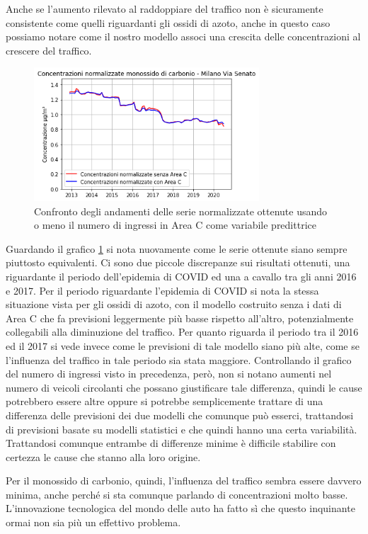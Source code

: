 \documentclass[a4paper]{report}
\begin{document}
Anche se l'aumento rilevato al raddoppiare del traffico non è sicuramente consistente come quelli riguardanti gli ossidi di azoto, anche in questo caso possiamo notare come il nostro modello associ una crescita delle concentrazioni al crescere del traffico. 

\begin{figure}[h]
\centering
\includegraphics[width=0.75\textwidth]{co_areac}
\caption{Confronto degli andamenti delle serie normalizzate ottenute usando o meno il numero di ingressi in Area C come variabile predittrice}
\label{fig:co_areac}
\end{figure}

Guardando il grafico \ref{fig:co_areac} si nota nuovamente come le serie ottenute siano sempre piuttosto equivalenti. Ci sono due piccole discrepanze sui risultati ottenuti, una riguardante il periodo dell'epidemia di COVID ed una a cavallo tra gli anni 2016 e 2017.
Per il periodo riguardante l'epidemia di COVID si nota la stessa situazione vista per gli ossidi di azoto, con il modello costruito senza i dati di Area C che fa previsioni leggermente più basse rispetto all'altro, potenzialmente collegabili alla diminuzione del traffico. Per quanto riguarda il periodo tra il 2016 ed il 2017 si vede invece come le previsioni di tale modello siano più alte, come se l'influenza del traffico in tale periodo sia stata maggiore. Controllando il grafico del numero di ingressi visto in precedenza, però, non si notano aumenti nel numero di veicoli circolanti che possano giustificare tale differenza, quindi le cause potrebbero essere altre oppure si potrebbe semplicemente trattare di una differenza delle previsioni dei due modelli che comunque può esserci, trattandosi di previsioni basate su modelli statistici e che quindi hanno una certa variabilità.
Trattandosi comunque entrambe di differenze minime è difficile stabilire con certezza le cause che stanno alla loro origine.

Per il monossido di carbonio, quindi, l'influenza del traffico sembra essere davvero minima, anche perché si sta comunque parlando di concentrazioni molto basse. L'innovazione tecnologica del mondo delle auto ha fatto sì che questo inquinante ormai non sia più un effettivo problema.
\end{document}

